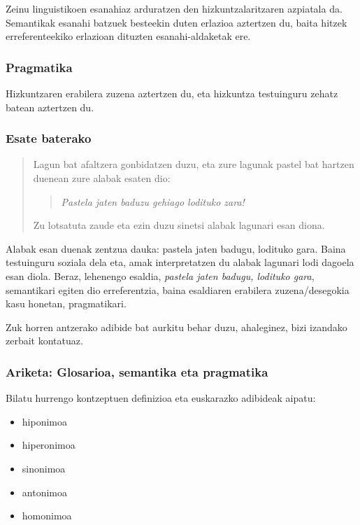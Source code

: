 \documentclass[
]{book}
\providecommand{\tightlist}{%
  \setlength{\itemsep}{0pt}\setlength{\parskip}{0pt}}
\begin{document}
Zeinu linguistikoen esanahiaz arduratzen den hizkuntzalaritzaren azpiatala da. Semantikak esanahi batzuek besteekin duten erlazioa aztertzen du, baita hitzek erreferenteekiko erlazioan dituzten esanahi-aldaketak ere.

\hypertarget{pragmatika}{%
\subsubsection{Pragmatika}\label{pragmatika}}

Hizkuntzaren erabilera zuzena aztertzen du, eta hizkuntza testuinguru zehatz batean aztertzen du.

\hypertarget{esate-baterako}{%
\subsubsection{Esate baterako}\label{esate-baterako}}

\begin{quote}
Lagun bat afaltzera gonbidatzen duzu, eta zure lagunak pastel bat
hartzen duenean zure alabak esaten dio:

\begin{quote}
\emph{Pastela jaten baduzu gehiago lodituko zara!}
\end{quote}

Zu lotsatuta zaude eta ezin duzu sinetsi alabak lagunari esan diona.
\end{quote}

Alabak esan duenak zentzua dauka: pastela jaten badugu, lodituko gara. Baina testuinguru soziala dela eta, amak interpretatzen du alabak lagunari lodi dagoela esan diola. Beraz, lehenengo esaldia, \emph{pastela jaten badugu, lodituko gara}, semantikari egiten dio erreferentzia, baina esaldiaren erabilera zuzena/desegokia kasu honetan, pragmatikari.

Zuk horren antzerako adibide bat aurkitu behar duzu, ahaleginez, bizi izandako zerbait kontatuaz.

\hypertarget{ariketa-glosarioa-semantika-eta-pragmatika}{%
\subsubsection{Ariketa: Glosarioa, semantika eta pragmatika}\label{ariketa-glosarioa-semantika-eta-pragmatika}}

Bilatu hurrengo kontzeptuen definizioa eta euskarazko adibideak aipatu:

\begin{itemize}
\tightlist
\item
  hiponimoa
\item
  hiperonimoa
\item
  sinonimoa
\item
  antonimoa
\item
  homonimoa
\end{itemize}
\end{document}
